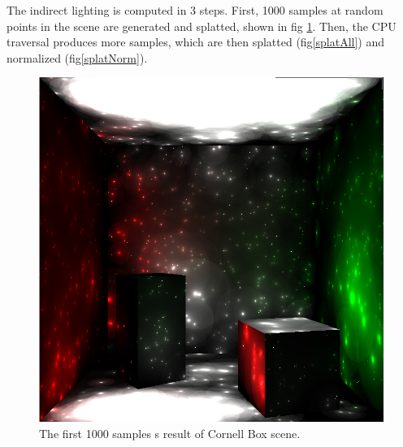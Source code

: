 \documentclass[10pt,twopage]{acmsiggraph}
\begin{document}
The indirect lighting is computed in 3 steps.  First, 1000 samples at random points in the scene are generated and splatted, shown in fig \ref{splat1000}.  Then, the CPU traversal produces more samples, which are then splatted (fig\ref{splatAll}) and normalized (fig\ref{splatNorm}).

\begin{figure}[htbp]
\begin{center}
\includegraphics[scale = .3]{1000Samples.png}
\caption{The first 1000 samples s result of Cornell Box scene.}
\label{splat1000}
\end{center}
\end{figure}
\end{document}
